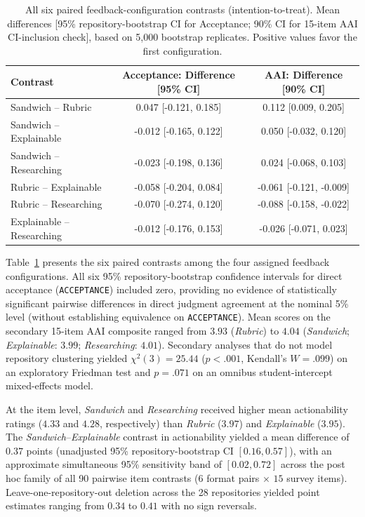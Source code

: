 \documentclass{llncs}
\begin{document}
\begin{table}[t]
\caption{All six paired feedback-configuration contrasts (intention-to-treat). Mean differences [95\% repository-bootstrap CI for Acceptance; 90\% CI for 15-item AAI CI-inclusion check], based on 5,000 bootstrap replicates. Positive values favor the first configuration.}
\label{tab:rq2}
\centering\scriptsize
\renewcommand{\arraystretch}{0.86}
\setlength{\aboverulesep}{1pt}
\setlength{\belowrulesep}{1.2pt}
\setlength\tabcolsep{3pt}
\begin{tabular}{@{}lcc@{}}
\toprule
Contrast & Acceptance: Difference [95\% CI] & AAI: Difference [90\% CI] \\
\midrule
Sandwich -- Rubric & 0.047 [-0.121, 0.185] & 0.112 [0.009, 0.205] \\
Sandwich -- Explainable & -0.012 [-0.165, 0.122] & 0.050 [-0.032, 0.120] \\
Sandwich -- Researching & -0.023 [-0.198, 0.136] & 0.024 [-0.068, 0.103] \\
Rubric -- Explainable & -0.058 [-0.204, 0.084] & -0.061 [-0.121, -0.009] \\
Rubric -- Researching & -0.070 [-0.274, 0.120] & -0.088 [-0.158, -0.022] \\
Explainable -- Researching & -0.012 [-0.176, 0.153] & -0.026 [-0.071, 0.023] \\
\bottomrule
\end{tabular}
\vspace{-2mm}
\end{table}

Table~\ref{tab:rq2} presents the six paired contrasts among the four assigned feedback configurations. All six 95\% repository-bootstrap confidence intervals for direct acceptance (\texttt{ACCEPTANCE}) included zero, providing no evidence of statistically significant pairwise differences in direct judgment agreement at the nominal 5\% level (without establishing equivalence on \texttt{ACCEPTANCE}). Mean scores on the secondary 15-item AAI composite ranged from $3.93$ (\textit{Rubric}) to $4.04$ (\textit{Sandwich}; \textit{Explainable}: $3.99$; \textit{Researching}: $4.01$). Secondary analyses that do not model repository clustering yielded $\chi^2(3) = 25.44$ ($p < .001$, Kendall's $W = .099$) on an exploratory Friedman test and $p = .071$ on an omnibus student-intercept mixed-effects model.

At the item level, \textit{Sandwich} and \textit{Researching} received higher mean actionability ratings ($4.33$ and $4.28$, respectively) than \textit{Rubric} ($3.97$) and \textit{Explainable} ($3.95$). The \textit{Sandwich}--\textit{Explainable} contrast in actionability yielded a mean difference of $0.37$ points (unadjusted 95\% repository-bootstrap CI $[0.16, 0.57]$), with an approximate simultaneous 95\% sensitivity band of $[0.02, 0.72]$ across the post hoc family of all 90 pairwise item contrasts ($6$ format pairs $\times$ $15$ survey items). Leave-one-repository-out deletion across the 28 repositories yielded point estimates ranging from $0.34$ to $0.41$ with no sign reversals.
\end{document}
